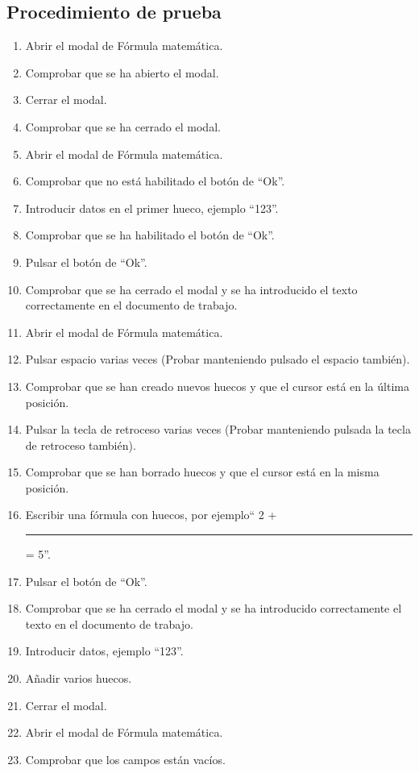 \subsection{Procedimiento de prueba}
\label{procedimientoPruebas:mate}
\begin{enumerate}
    \item Abrir el modal de Fórmula matemática.
    \item Comprobar que se ha abierto el modal.
    \item Cerrar el modal.
    \item Comprobar que se ha cerrado el modal.
    \item Abrir el modal de Fórmula matemática.
    \item Comprobar que no está habilitado el botón de ``Ok''.
    \item Introducir datos en el primer hueco, ejemplo ``123''.
    \item Comprobar que se ha habilitado el botón de ``Ok''.
    \item Pulsar el botón de ``Ok''.
    \item Comprobar que se ha cerrado el modal y se ha introducido el texto correctamente en el documento de trabajo.
    \item Abrir el modal de Fórmula matemática.
    \item Pulsar espacio varias veces (Probar manteniendo pulsado el espacio también).
    \item Comprobar que se han creado nuevos huecos y que el cursor está en la última posición.
    \item Pulsar la tecla de retroceso varias veces (Probar manteniendo pulsada la tecla de retroceso también).
    \item Comprobar que se han borrado huecos y que el cursor está en la misma posición.
    \item Escribir una fórmula con huecos, por ejemplo`` 2 + \rule{10mm}{0.1mm} = 5''.
    \item Pulsar el botón de ``Ok''.
    \item Comprobar que se ha cerrado el modal y se ha introducido correctamente el texto en el documento de trabajo.
    \item Introducir datos, ejemplo ``123''.
    \item Añadir varios huecos.
    \item Cerrar el modal.
    \item Abrir el modal de Fórmula matemática.
    \item Comprobar que los campos están vacíos.
\end{enumerate}

